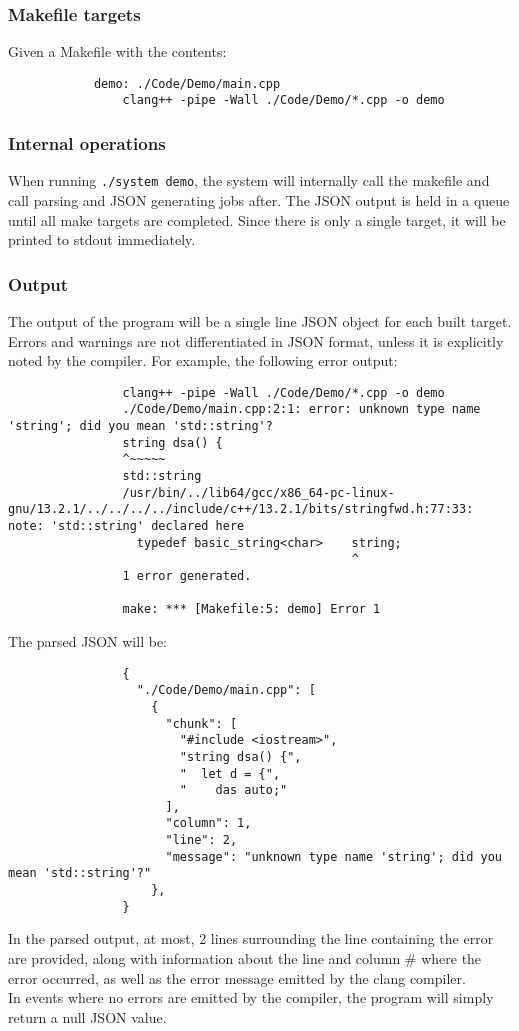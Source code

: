 \documentclass{article}
\begin{document}
		\subsubsection{Makefile targets}
			Given a Makefile with the contents:
			\begin{verbatim}
			demo: ./Code/Demo/main.cpp
				clang++ -pipe -Wall ./Code/Demo/*.cpp -o demo
			\end{verbatim}
		\subsubsection{Internal operations}
			When running \texttt{./system demo}, the system will internally call the makefile and call parsing and JSON generating jobs after. The JSON output is held in a queue until all make targets are completed. Since there is only a single target, it will be printed to stdout immediately.
		\subsubsection{Output}
			The output of the program will be a single line JSON object for each built target. Errors and warnings are not differentiated in JSON format, unless it is explicitly noted by the compiler. For example, the following error output:
			\begin{verbatim}
				clang++ -pipe -Wall ./Code/Demo/*.cpp -o demo
				./Code/Demo/main.cpp:2:1: error: unknown type name 'string'; did you mean 'std::string'?
				string dsa() {
				^~~~~~
				std::string
				/usr/bin/../lib64/gcc/x86_64-pc-linux-gnu/13.2.1/../../../../include/c++/13.2.1/bits/stringfwd.h:77:33: note: 'std::string' declared here
				  typedef basic_string<char>    string;   
				                                ^
				1 error generated.

				make: *** [Makefile:5: demo] Error 1
			\end{verbatim}
			The parsed JSON will be:
			\begin{verbatim}
				{
				  "./Code/Demo/main.cpp": [
				    {
				      "chunk": [
				        "#include <iostream>",
				        "string dsa() {",
				        "  let d = {",
				        "    das auto;"
				      ],
				      "column": 1,
				      "line": 2,
				      "message": "unknown type name 'string'; did you mean 'std::string'?"
				    },
				}
			\end{verbatim}
			In the parsed output, at most, 2 lines surrounding the line containing the error are provided, along with information about the line and column \# where the error occurred, as well as the error message emitted by the clang compiler. \\
			In events where no errors are emitted by the compiler, the program will simply return a null JSON value.
\end{document}
